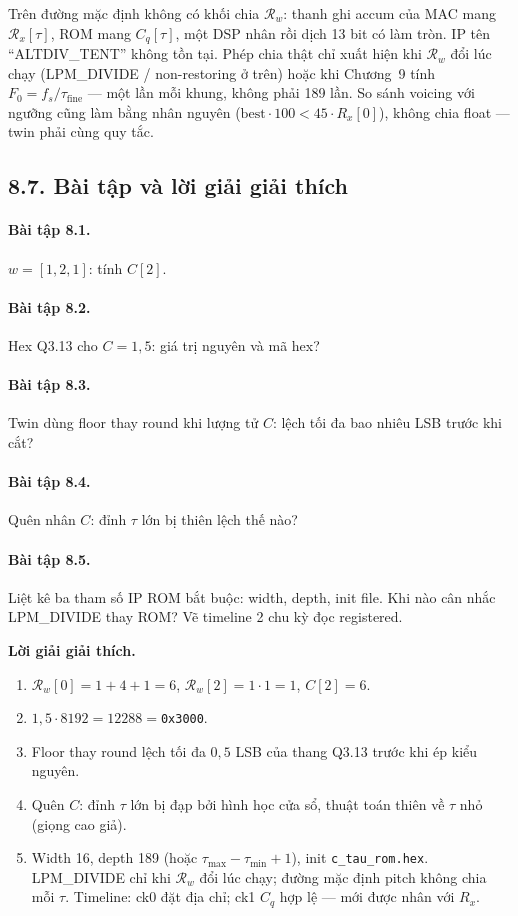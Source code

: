 Trên đường mặc định không có khối chia $\mathcal{R}_w$: thanh ghi accum của MAC mang $\mathcal{R}_x[\tau]$, ROM mang $C_q[\tau]$, một DSP nhân rồi dịch 13 bit có làm tròn. IP tên ``ALTDIV\_TENT'' không tồn tại. Phép chia thật chỉ xuất hiện khi $\mathcal{R}_w$ đổi lúc chạy (LPM\_DIVIDE / non-restoring ở trên) hoặc khi Chương~9 tính $F_0=f_s/\tau_{\mathrm{fine}}$ --- một lần mỗi khung, không phải 189 lần. So sánh voicing với ngưỡng cũng làm bằng nhân nguyên ($\mathrm{best}\cdot 100 < 45\cdot R_x[0]$), không chia float --- twin phải cùng quy tắc.

\subsection*{8.7. Bài tập và lời giải giải thích}

\paragraph{Bài tập 8.1.} $w=[1,2,1]$: tính $C[2]$.

\paragraph{Bài tập 8.2.} Hex Q3.13 cho $C = 1{,}5$: giá trị nguyên và mã hex?

\paragraph{Bài tập 8.3.} Twin dùng floor thay round khi lượng tử $C$: lệch tối đa bao nhiêu LSB trước khi cắt?

\paragraph{Bài tập 8.4.} Quên nhân $C$: đỉnh $\tau$ lớn bị thiên lệch thế nào?

\paragraph{Bài tập 8.5.} Liệt kê ba tham số IP ROM bắt buộc: width, depth, init file. Khi nào cân nhắc LPM\_DIVIDE thay ROM? Vẽ timeline 2 chu kỳ đọc registered.

\noindent\textbf{Lời giải giải thích.}
\begin{enumerate}[leftmargin=1.4em]
\item $\mathcal{R}_w[0] = 1+4+1 = 6$, $\mathcal{R}_w[2] = 1\cdot 1 = 1$, $C[2] = 6$.
\item $1{,}5\cdot 8192 = 12288 = $\texttt{0x3000}.
\item Floor thay round lệch tối đa $0{,}5$ LSB của thang Q3.13 trước khi ép kiểu nguyên.
\item Quên $C$: đỉnh $\tau$ lớn bị đạp bởi hình học cửa sổ, thuật toán thiên về $\tau$ nhỏ (giọng cao giả).
\item Width 16, depth 189 (hoặc $\tau_{\max}-\tau_{\min}+1$), init \texttt{c\_tau\_rom.hex}. LPM\_DIVIDE chỉ khi $\mathcal{R}_w$ đổi lúc chạy; đường mặc định pitch không chia mỗi $\tau$. Timeline: ck0 đặt địa chỉ; ck1 $C_q$ hợp lệ --- mới được nhân với $R_x$.
\end{enumerate}
